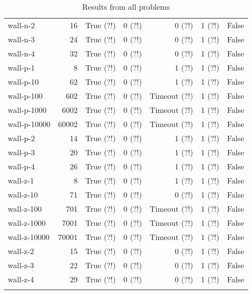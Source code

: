 \begin{longtable}{lrlrrrl}
wall-n-2 & 16 & True (?!) & 0 (?!) & 0 (?!) & 1 (?!) & False \\
wall-n-3 & 24 & True (?!) & 0 (?!) & 0 (?!) & 1 (?!) & False \\
wall-n-4 & 32 & True (?!) & 0 (?!) & 0 (?!) & 1 (?!) & False \\
wall-p-1 & 8 & True (?!) & 0 (?!) & 1 (?!) & 1 (?!) & False \\
wall-p-10 & 62 & True (?!) & 0 (?!) & 1 (?!) & 1 (?!) & False \\
wall-p-100 & 602 & True (?!) & 0 (?!) & Timeout (?!) & 1 (?!) & False \\
wall-p-1000 & 6002 & True (?!) & 0 (?!) & Timeout (?!) & 1 (?!) & False \\
wall-p-10000 & 60002 & True (?!) & 0 (?!) & Timeout (?!) & 1 (?!) & False \\
wall-p-2 & 14 & True (?!) & 0 (?!) & 1 (?!) & 1 (?!) & False \\
wall-p-3 & 20 & True (?!) & 0 (?!) & 1 (?!) & 1 (?!) & False \\
wall-p-4 & 26 & True (?!) & 0 (?!) & 1 (?!) & 1 (?!) & False \\
wall-z-1 & 8 & True (?!) & 0 (?!) & 1 (?!) & 1 (?!) & False \\
wall-z-10 & 71 & True (?!) & 0 (?!) & 0 (?!) & 1 (?!) & False \\
wall-z-100 & 701 & True (?!) & 0 (?!) & Timeout (?!) & 1 (?!) & False \\
wall-z-1000 & 7001 & True (?!) & 0 (?!) & Timeout (?!) & 1 (?!) & False \\
wall-z-10000 & 70001 & True (?!) & 0 (?!) & Timeout (?!) & 1 (?!) & False \\
wall-z-2 & 15 & True (?!) & 0 (?!) & 0 (?!) & 1 (?!) & False \\
wall-z-3 & 22 & True (?!) & 0 (?!) & 0 (?!) & 1 (?!) & False \\
wall-z-4 & 29 & True (?!) & 0 (?!) & 0 (?!) & 1 (?!) & False \\
\caption{Results from all problems}\label{table:results}
\end{longtable}